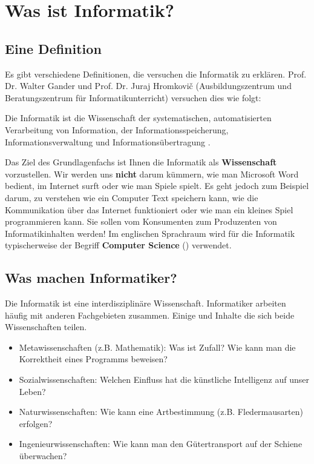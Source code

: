 \toggletrue{image}
\togglefalse{imagehover}

\chapter{Was ist Informatik?}
\label{chapter-was-ist-informatik}

\section{Eine Definition}

Es gibt verschiedene Definitionen, die versuchen die Informatik zu erklären. Prof. Dr. Walter Gander und Prof. Dr. Juraj Hromkovič (Ausbildungszentrum und Beratungszentrum für Informatikunterricht) versuchen
dies wie folgt:

\begin{definition}[Informatik]
Die Informatik ist die Wissenschaft der systematischen, automatisierten Verarbeitung von Information, der Informationsspeicherung, Informationsverwaltung und Informationsübertragung \cite{def-informatik}.
\end{definition}

Das Ziel des Grundlagenfachs ist Ihnen die Informatik als \textbf{Wissenschaft} vorzustellen. Wir werden uns \textbf{nicht} darum kümmern, wie man Microsoft Word bedient, im Internet surft oder wie man Spiele spielt. Es geht jedoch zum Beispiel darum, zu verstehen wie ein Computer Text speichern kann, wie die Kommunikation über das Internet funktioniert oder wie man ein kleines Spiel programmieren kann. Sie sollen vom Konsumenten zum Produzenten von Informatikinhalten werden! Im englischen Sprachraum wird für die Informatik typischerweise der Begriff \textbf{Computer Science} () verwendet.

\section{Was machen Informatiker?}

Die Informatik ist eine interdisziplinäre Wissenschaft. Informatiker arbeiten häufig mit anderen Fachgebieten zusammen. Einige  und Inhalte die sich beide Wissenschaften teilen.

\begin{itemize}
\item Metawissenschaften (z.B. Mathematik): Was ist Zufall? Wie kann man die Korrektheit eines Programms beweisen?
\item Sozialwissenschaften: Welchen Einfluss hat die künstliche Intelligenz auf unser Leben?
\item Naturwissenschaften: Wie kann eine Artbestimmung (z.B. Fledermausarten) erfolgen?
\item Ingenieurwissenschaften: Wie kann man den Gütertransport auf der Schiene überwachen?
\end{itemize}

